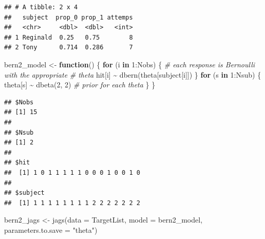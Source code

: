\documentclass[
  12pt,
]{book}
\newenvironment{Shaded}{\begin{snugshade}}{\end{snugshade}}
\newcommand{\AttributeTok}[1]{\textcolor[rgb]{0.77,0.63,0.00}{#1}}
\newcommand{\CommentTok}[1]{\textcolor[rgb]{0.56,0.35,0.01}{\textit{#1}}}
\newcommand{\ControlFlowTok}[1]{\textcolor[rgb]{0.13,0.29,0.53}{\textbf{#1}}}
\newcommand{\DecValTok}[1]{\textcolor[rgb]{0.00,0.00,0.81}{#1}}
\newcommand{\FunctionTok}[1]{\textcolor[rgb]{0.00,0.00,0.00}{#1}}
\newcommand{\NormalTok}[1]{#1}
\newcommand{\OtherTok}[1]{\textcolor[rgb]{0.56,0.35,0.01}{#1}}
\newcommand{\SpecialCharTok}[1]{\textcolor[rgb]{0.00,0.00,0.00}{#1}}
\newcommand{\StringTok}[1]{\textcolor[rgb]{0.31,0.60,0.02}{#1}}
\theoremstyle{definition}
\theoremstyle{definition}
\theoremstyle{definition}
\theoremstyle{remark}
\begin{document}
\begin{verbatim}
## # A tibble: 2 x 4
##   subject  prop_0 prop_1 attemps
##   <chr>     <dbl>  <dbl>   <int>
## 1 Reginald  0.25   0.75        8
## 2 Tony      0.714  0.286       7
\end{verbatim}

\begin{Shaded}
\begin{Highlighting}[]
\NormalTok{bern2\_model }\OtherTok{\textless{}{-}} \ControlFlowTok{function}\NormalTok{() \{}
    \ControlFlowTok{for}\NormalTok{ (i }\ControlFlowTok{in} \DecValTok{1}\SpecialCharTok{:}\NormalTok{Nobs) \{}
        \CommentTok{\# each response is Bernoulli with the appropriate}
        \CommentTok{\# theta}
\NormalTok{        hit[i] }\SpecialCharTok{\textasciitilde{}} \FunctionTok{dbern}\NormalTok{(theta[subject[i]])}
\NormalTok{    \}}
    \ControlFlowTok{for}\NormalTok{ (s }\ControlFlowTok{in} \DecValTok{1}\SpecialCharTok{:}\NormalTok{Nsub) \{}
\NormalTok{        theta[s] }\SpecialCharTok{\textasciitilde{}} \FunctionTok{dbeta}\NormalTok{(}\DecValTok{2}\NormalTok{, }\DecValTok{2}\NormalTok{)  }\CommentTok{\# prior for each theta}
\NormalTok{    \}}
\NormalTok{\}}
\end{Highlighting}
\end{Shaded}

\begin{Shaded}
\end{Shaded}

\begin{verbatim}
## $Nobs
## [1] 15
## 
## $Nsub
## [1] 2
## 
## $hit
##  [1] 1 0 1 1 1 1 1 0 0 0 1 0 0 1 0
## 
## $subject
##  [1] 1 1 1 1 1 1 1 1 2 2 2 2 2 2 2
\end{verbatim}

\begin{Shaded}
\begin{Highlighting}[]
\NormalTok{bern2\_jags }\OtherTok{\textless{}{-}} \FunctionTok{jags}\NormalTok{(}\AttributeTok{data =}\NormalTok{ TargetList, }\AttributeTok{model =}\NormalTok{ bern2\_model, }
    \AttributeTok{parameters.to.save =} \StringTok{"theta"}\NormalTok{)}
\end{Highlighting}
\end{Shaded}
\end{document}
